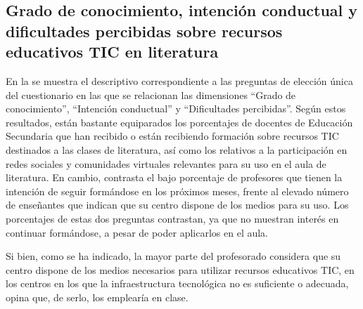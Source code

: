 \documentclass[spanish]{textolivre}
\begin{document}
\subsection{Grado de conocimiento, intención conductual y dificultades percibidas sobre recursos educativos TIC en literatura}\label{sec-modelo}
En la  se muestra el descriptivo correspondiente a las preguntas de elección única del cuestionario en las que se relacionan las dimensiones “Grado de conocimiento”, “Intención conductual” y “Dificultades percibidas”. Según estos resultados, están bastante equiparados los porcentajes de docentes de Educación Secundaria que han recibido o están recibiendo formación sobre recursos TIC destinados a las clases de literatura, así como los relativos a la participación en redes sociales y comunidades virtuales relevantes para su uso en el aula de literatura. En cambio, contrasta el bajo porcentaje de profesores que tienen la intención de seguir formándose en los próximos meses, frente al elevado número de enseñantes que indican que su centro dispone de los medios para su uso. Los porcentajes de estas dos preguntas contrastan, ya que no muestran interés en continuar formándose, a pesar de poder aplicarlos en el aula. 

Si bien, como se ha indicado, la mayor parte del profesorado considera que su centro dispone de los medios necesarios para utilizar recursos educativos TIC, en los centros en los que la infraestructura tecnológica no es suficiente o adecuada, opina que, de serlo, los emplearía en clase.
\end{document}
